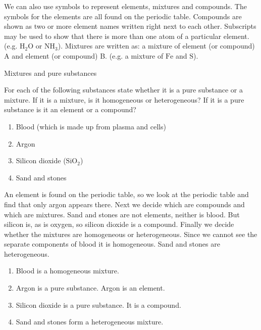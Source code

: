 \label{m38708*id0124}We can also use symbols to represent elements, mixtures and compounds. The symbols for the elements are all found on the periodic table. Compounds are shown as two or more element names written right next to each other. Subscripts may be used to show that there is more than one atom of a particular element. (e.g. $\text{H}_{2}\text{O}$ or $\text{NH}_{3}$). Mixtures are written as: a mixture of element (or compound) A and element (or compound) B. (e.g. a mixture of $\text{Fe}$ and $\text{S}$).\nopagebreak
      \begin{wex} 
{Mixtures and pure substances}
{For each of the following substances state whether it is a pure substance or a mixture. If it is a mixture, is it homogeneous or heterogeneous? If it is a pure substance is it an element or a compound? 
\begin{enumerate}[noitemsep, label=\textbf{\alph*}. ] 
\item Blood (which is made up from plasma and cells)
\item Argon
\item Silicon dioxide (${\text{SiO}}_{2}$)
\item Sand and stones
\end{enumerate}
  }
{
An element is found on the periodic table, so we look at the periodic table and find that only argon appears there. Next we decide which are compounds and which are mixtures. Sand and stones are not elements, neither is blood. But silicon is, as is oxygen, so silicon dioxide is a compound. Finally we decide whether the mixtures are homogeneous or heterogeneous. Since we cannot see the separate components of blood it is homogeneous. Sand and stones are heterogeneous.
\begin{enumerate}
[noitemsep, label=\textbf{\alph*}. ]
\item Blood is a homogeneous mixture.
\item Argon is a pure substance. Argon is an element.
\item Silicon dioxide is a pure substance. It is a compound.
\item Sand and stones form a heterogeneous mixture.
\end{enumerate}}
    \end{wex}
